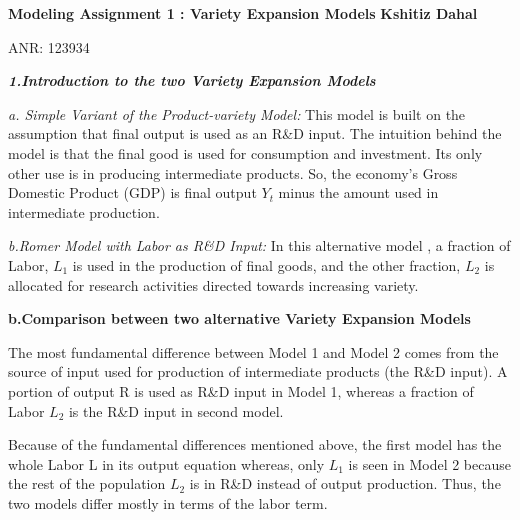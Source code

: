 \documentclass[a4paper, 12pt]{article}
\begin{document}
	\begin{center}
	\textbf{Modeling Assignment 1 : Variety Expansion Models}
	\linebreak
	\linebreak	
	\textbf{Kshitiz Dahal}
	\linebreak
	\linebreak
	
	ANR: 123934	
	\end{center}
	\newpage
	\begin{flushleft}
		\textbf{\textit{1.Introduction to the two Variety Expansion Models }}
	\end{flushleft}
	\begin{flushleft}
		\textit{a. Simple Variant of the Product-variety Model:} This model is built on the assumption that final output is used as an R\&D input. The intuition behind the model is that the final good is used for consumption and investment. Its only other use is in producing intermediate products. So, the economy's Gross Domestic Product (GDP) is final output	$ Y_t $ minus the amount used in intermediate production.
	\end{flushleft}
	\begin{flushleft}
		\textit{b.Romer Model with Labor as R\&D Input:} In this alternative model , a fraction of Labor, $ L_1 $ is used in the production of final goods, and the other fraction, $ L_2 $ is allocated for research activities directed towards increasing variety.
	\end{flushleft}
	\newpage
	\begin{center}
		\textbf{b.Comparison between two alternative Variety Expansion Models}
	\end{center}
	\begin{flushleft}
		The most fundamental difference between Model 1 and Model 2 comes from the source of input used for production of intermediate products (the R\&D input). A portion of output R is used as R\&D input in Model 1, whereas a fraction of Labor $ L_2 $ is the R\&D input in second model.
		
	\end{flushleft}
	\begin{flushleft}
		Because of the fundamental differences mentioned above, the first model has the whole Labor L in its output equation whereas, only $ L_1 $ is seen in Model 2 because the rest of the population $ L_2 $ is in R\&D instead of output production. Thus, the two models differ mostly in terms of the labor term.
	\end{flushleft}
\end{document}
